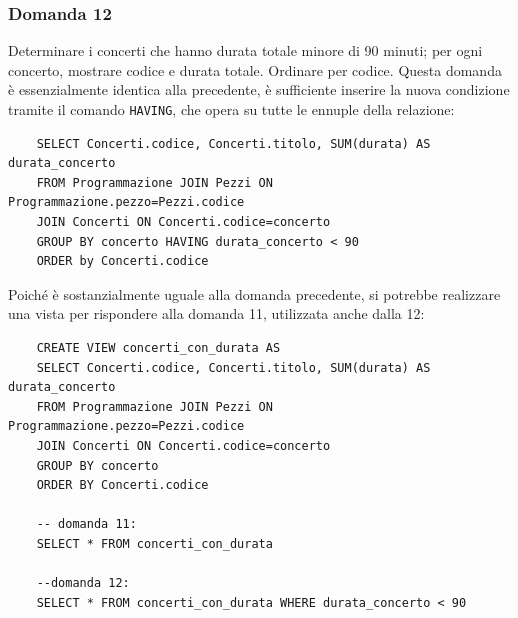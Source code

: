 \documentclass{article}
\begin{document}
\subsubsection*{Domanda 12}
Determinare i concerti che hanno durata totale minore di 90 minuti; per ogni concerto, mostrare codice e durata totale. Ordinare per codice. Questa domanda è essenzialmente identica alla precedente, è 
sufficiente inserire la nuova condizione tramite il comando \verb|HAVING|, che opera su tutte le ennuple della relazione: 
\begin{verbatim}
    SELECT Concerti.codice, Concerti.titolo, SUM(durata) AS durata_concerto
    FROM Programmazione JOIN Pezzi ON Programmazione.pezzo=Pezzi.codice
    JOIN Concerti ON Concerti.codice=concerto
    GROUP BY concerto HAVING durata_concerto < 90
    ORDER by Concerti.codice
\end{verbatim}
Poiché è sostanzialmente uguale alla domanda precedente, si potrebbe realizzare una vista per rispondere alla domanda 11, utilizzata anche dalla 12:
\begin{verbatim}
    CREATE VIEW concerti_con_durata AS
    SELECT Concerti.codice, Concerti.titolo, SUM(durata) AS durata_concerto
    FROM Programmazione JOIN Pezzi ON Programmazione.pezzo=Pezzi.codice
    JOIN Concerti ON Concerti.codice=concerto
    GROUP BY concerto
    ORDER BY Concerti.codice

    -- domanda 11:
    SELECT * FROM concerti_con_durata

    --domanda 12:
    SELECT * FROM concerti_con_durata WHERE durata_concerto < 90
\end{verbatim}
\end{document}
